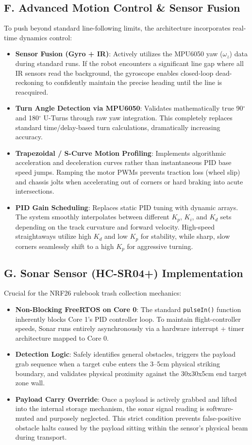 \documentclass[12pt,a4paper]{article}
\begin{document}
\subsection*{F. Advanced Motion Control \& Sensor Fusion}
To push beyond standard line-following limits, the architecture incorporates real-time dynamics control:
\begin{itemize}
    \item \textbf{Sensor Fusion (Gyro + IR)}: Actively utilizes the MPU6050 yaw ($\omega_z$) data during standard runs. If the robot encounters a significant line gap where all IR sensors read the background, the gyroscope enables closed-loop dead-reckoning to confidently maintain the precise heading until the line is reacquired.
    \item \textbf{Turn Angle Detection via MPU6050}: Validates mathematically true 90$^\circ$ and 180$^\circ$ U-Turns through raw yaw integration. This completely replaces standard time/delay-based turn calculations, dramatically increasing accuracy.
    \item \textbf{Trapezoidal / S-Curve Motion Profiling}: Implements algorithmic acceleration and deceleration curves rather than instantaneous PID base speed jumps. Ramping the motor PWMs prevents traction loss (wheel slip) and chassis jolts when accelerating out of corners or hard braking into acute intersections.
    \item \textbf{PID Gain Scheduling}: Replaces static PID tuning with dynamic arrays. The system smoothly interpolates between different $K_p$, $K_i$, and $K_d$ sets depending on the track curvature and forward velocity. High-speed straightaways utilize high $K_d$ and low $K_p$ for stability, while sharp, slow corners seamlessly shift to a high $K_p$ for aggressive turning.
\end{itemize}

\subsection*{G. Sonar Sensor (HC-SR04+) Implementation}
Crucial for the NRF26 rulebook trash collection mechanics:
\begin{itemize}
    \item \textbf{Non-Blocking FreeRTOS on Core 0}: The standard \lstinline|pulseIn()| function inherently blocks Core 1's PID controller loop. To maintain flight-controller speeds, Sonar runs entirely asynchronously via a hardware interrupt + timer architecture mapped to Core 0.
    \item \textbf{Detection Logic}: Safely identifies general obstacles, triggers the payload grab sequence when a target cube enters the 3--5cm physical striking boundary, and validates physical proximity against the 30x30x5cm end target zone wall. 
    \item \textbf{Payload Carry Override}: Once a payload is actively grabbed and lifted into the internal storage mechanism, the sonar signal reading is software-muted and purposely neglected. This strict condition prevents false-positive obstacle halts caused by the payload sitting within the sensor's physical beam during transport.
\end{itemize}
\end{document}
